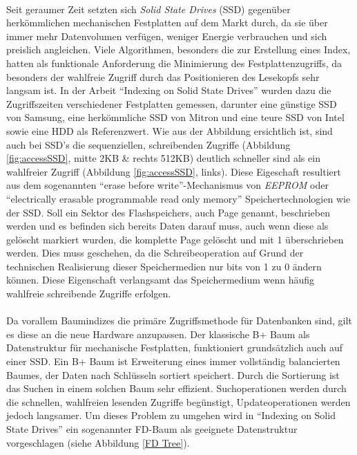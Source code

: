 \paragraph{}
Seit geraumer Zeit setzten sich \textit{Solid State Drives} (SSD) gegenüber herkömmlichen mechanischen Festplatten auf dem Markt durch, da sie über immer mehr Datenvolumen verfügen, weniger Energie verbrauchen und sich preislich angleichen. Viele Algorithmen, besonders die zur Erstellung eines Index, hatten als funktionale Anforderung die Minimierung des Festplattenzugriffs, da besonders der wahlfreie Zugriff durch das Positionieren des Lesekopfs sehr langsam ist. In der Arbeit \enquote{Indexing on Solid State Drives}\cite{ssd} wurden dazu die Zugriffszeiten verschiedener Festplatten gemessen, darunter eine günstige SSD von Samsung, eine herkömmliche SSD von Mitron und eine teure SSD von Intel sowie eine HDD als Referenzwert. Wie aus der Abbildung ersichtlich ist, sind auch bei SSD's die sequenziellen, schreibenden Zugriffe (Abbildung \ref{fig:accessSSD}, mitte 2KB \& rechts 512KB) deutlich schneller sind als ein wahlfreier Zugriff (Abbildung \ref{fig:accessSSD}, links). Diese Eigeschaft resultiert aus dem sogenannten \enquote{erase before write}-Mechanismus von \textit{EEPROM} oder \enquote{electrically erasable programmable read only memory} Speichertechnologien wie der SSD. Soll ein Sektor des Flashspeichers, auch Page genannt, beschrieben werden und es befinden sich bereits Daten darauf muss, auch wenn diese als gelöscht markiert wurden, die komplette Page gelöscht und mit 1 überschrieben werden. Dies muss geschehen, da die Schreibeoperation auf Grund der technischen Realisierung dieser Speichermedien nur bits von 1 zu 0 ändern können. Diese Eigenschaft verlangsamt das Speichermedium wenn häufig wahlfreie schreibende Zugriffe erfolgen.\par

\paragraph{}
Da vorallem Baumindizes die primäre Zugriffsmethode für Datenbanken sind, gilt es diese an die neue Hardware anzupassen. Der klassische B+ Baum als Datenstruktur für mechanische Festplatten, funktioniert grundsätzlich auch auf einer SSD. Ein B+ Baum ist Erweiterung eines immer vollständig balancierten Baumes, der Daten nach Schlüsseln sortiert speichert. Durch die Sortierung ist das Suchen in einem solchen Baum sehr effizient. Suchoperationen werden durch die schnellen, wahlfreien lesenden Zugriffe begünstigt, Updateoperationen werden jedoch langsamer. Um dieses Problem zu umgehen wird in \enquote{Indexing on Solid State Drives}\cite{ssd} ein sogenannter FD-Baum als geeignete Datenstruktur vorgeschlagen (siehe Abbildung \ref{FD Tree}).\par

